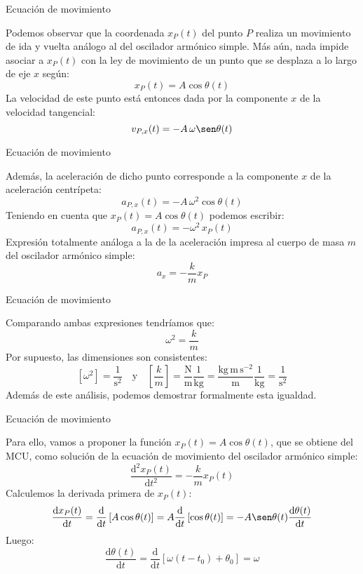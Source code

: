 \documentclass[11pt,handout,aspectratio=1610]{beamer}
\newcommand{\fdiff}[2]{\dfrac{\text{d} #1}{\text{d} #2}}
\newcommand{\fddiff}[2]{\frac{\text{d}^2 #1}{\text{d} #2^2}}
\begin{document}
\begin{frame}{Ecuación de movimiento}

    Podemos observar que la coordenada $x_P (t)$ del punto $P$ realiza un movimiento de ida y vuelta análogo al del oscilador armónico simple. Más aún, nada impide asociar a $x_P (t)$ con la ley de movimiento de un punto que se desplaza a lo largo de eje $x$ según: $$x_P (t) = A \cos \theta (t)$$ La velocidad de este punto está entonces dada por la componente $x$ de la velocidad tangencial: $$v_{P,x} (t) = - A \, \omega \sen \theta (t)$$

\end{frame}

\begin{frame}{Ecuación de movimiento}

    Además, la aceleración de dicho punto corresponde a la componente $x$ de la aceleración centrípeta: $$a_{P,x} (t) = - A \, \omega^2 \cos \theta (t)$$ Teniendo en cuenta que $x_P (t) = A \cos \theta (t)$ podemos escribir: $$a_{P,x} (t) = - \omega^2 \, x_P (t)$$ Expresión totalmente análoga a la de la aceleración impresa al cuerpo de masa $m$ del oscilador armónico simple: $$a_x = - \frac{k}{m} x_P$$

\end{frame}

\begin{frame}{Ecuación de movimiento}

    Comparando ambas expresiones tendríamos que: $$\omega^2 = \frac{k}{m}$$ Por supuesto, las dimensiones son consistentes: $$\left[\omega^2\right] = \frac{1}{\text{s}^2} \quad \text{y} \quad \left[\frac{k}{m}\right] = \frac{\text{N}}{\text{m}} \frac{1}{\text{kg}} = \frac{\text{kg} \, \text{m} \, \text{s}^{-2}}{\text{m}} \frac{1}{\text{kg}} = \frac{1}{\text{s}^{2}}$$ Además de este análisis, podemos demostrar formalmente esta igualdad.

\end{frame}

\begin{frame}{Ecuación de movimiento}

    Para ello, vamos a proponer la función $x_P (t) = A \cos \theta (t)$, que se obtiene del MCU, como solución de la ecuación de movimiento del oscilador armónico simple: $$\fddiff{x_P (t)}{t} = - \frac{k}{m} x_P (t)$$ Calculemos la derivada primera de $x_P (t)$: $$\fdiff{x_P (t)}{t} = \fdiff{}{t} \left[A \cos \theta (t)\right] = A \fdiff{}{t} \left[\cos \theta (t)\right] = - A \sen \theta (t) \fdiff{\theta (t)}{t}$$ Luego: $$\fdiff{\theta (t)}{t} = \fdiff{}{t} \left[\omega \left(t-t_0\right) + \theta_0\right] = \omega$$

\end{frame}
\end{document}
